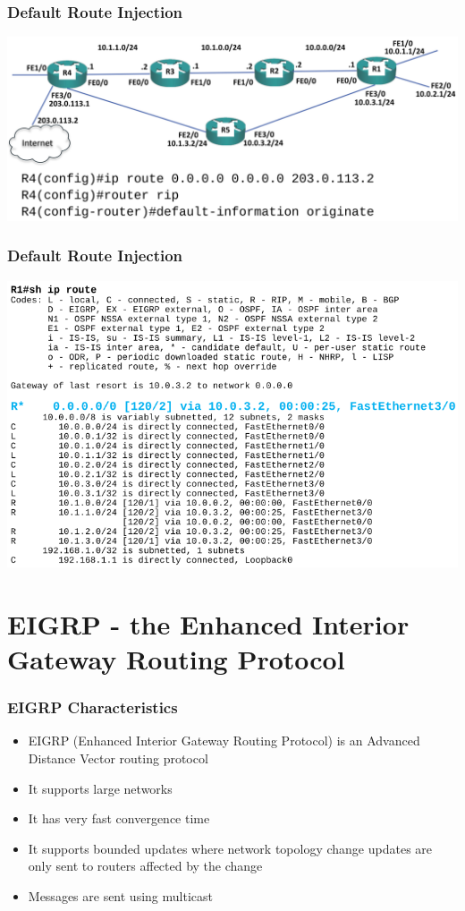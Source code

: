 \documentclass[pdflatex,compress,mathserif]{beamer}
\begin{document}
\begin{frame}
	\frametitle{Default Route Injection}
	\begin{center}
		\includegraphics[width=\linewidth]{img/img08}
	\end{center}
\end{frame}

\begin{frame}
	\frametitle{Default Route Injection}
	\begin{center}
		\includegraphics[width=\linewidth]{img/img09}
	\end{center}
\end{frame}

\section{EIGRP - the Enhanced Interior Gateway Routing Protocol}

\begin{frame}
	\frametitle{EIGRP Characteristics}
	\begin{itemize}
		\item EIGRP (Enhanced Interior Gateway Routing Protocol) is an
Advanced Distance Vector routing protocol
		\item It supports large networks
		\item It has very fast convergence time
		\item It supports bounded updates where network topology change
updates are only sent to routers affected by the change
		\item Messages are sent using multicast
	\end{itemize}
\end{frame}
\end{document}
